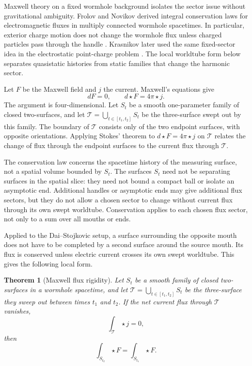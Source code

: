 \documentclass[aps,prd,10pt,onecolumn,nofootinbib,superscriptaddress,floatfix]{revtex4-2}
\newtheorem{theorem}{Theorem}
\begin{document}
Maxwell theory on a fixed wormhole background isolates the sector issue without
gravitational ambiguity.  Frolov and Novikov derived integral conservation laws
for electromagnetic fluxes in multiply connected wormhole spacetimes.  In
particular, exterior charge motion does not change the wormhole flux unless
charged particles pass through the handle
\cite{FrolovNovikov1990PhysicalEffects}.  Krasnikov later used the same
fixed-sector idea in the electrostatic point-charge problem
\cite{Krasnikov2008ElectrostaticInteraction}.  The local worldtube form below
separates quasistatic histories from static families that change the harmonic
sector.

Let $F$ be the Maxwell field and $j$ the current.  Maxwell's equations give
\begin{equation}
  dF=0,\qquad d\star F=4\pi \star j.
\end{equation}
The argument is four-dimensional.  Let $S_t$ be a smooth one-parameter
family of closed two-surfaces, and let
$\mathcal T=\bigcup_{t\in[t_1,t_2]}S_t$ be the three-surface swept out by this
family.  The boundary of $\mathcal T$ consists only of the two endpoint
surfaces, with opposite orientations.  Applying Stokes' theorem to
$d\star F=4\pi\star j$ on $\mathcal T$ relates the change of flux through the
endpoint surfaces to the current flux through $\mathcal T$.

The conservation law concerns the spacetime history of the measuring surface,
not a spatial volume bounded by $S_t$.  The surfaces $S_t$ need not be
separating surfaces in the spatial slice: they need not bound a compact ball
or isolate an asymptotic end.  Additional handles or asymptotic ends may give
additional flux sectors, but they do not allow a chosen sector to change
without current flux through its own swept worldtube.  Conservation applies to
each chosen flux sector, not only to a sum over all mouths or ends.

Applied to the Dai--Stojkovic setup, a surface surrounding the opposite mouth
does not have to be completed by a second surface around the source mouth.  Its
flux is conserved unless electric current crosses its own swept worldtube.
This gives the following local form.

\begin{theorem}[Maxwell flux rigidity]
\label{thm:maxwell-flux}
Let $S_t$ be a smooth family of closed two-surfaces in a wormhole spacetime,
and let $\mathcal T=\bigcup_{t\in[t_1,t_2]}S_t$ be the three-surface they sweep
out between times $t_1$ and $t_2$.  If the net current flux through
$\mathcal T$ vanishes,
\begin{equation}
  \int_{\mathcal T}\star j=0 ,
\end{equation}
then
\begin{equation}
  \int_{S_{t_2}}\star F=\int_{S_{t_1}}\star F .
\end{equation}
\end{theorem}
\end{document}
